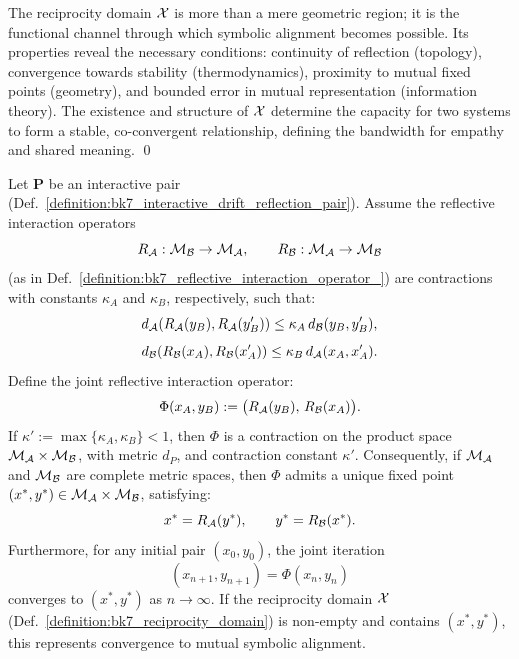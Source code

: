 \begin{scholium}
\label{scholium:bk7_reciprocity_as_symbolic_alignment_channel}
The reciprocity domain $\mathcal{X}$ is more than a mere geometric region; it is the functional channel through which symbolic alignment becomes possible. Its properties reveal the necessary conditions: continuity of reflection (topology), convergence towards stability (thermodynamics), proximity to mutual fixed points (geometry), and bounded error in mutual representation (information theory). The existence and structure of $\mathcal{X}$ determine the capacity for two systems to form a stable, co-convergent relationship, defining the bandwidth for empathy and shared meaning. \qed
\end{scholium}
\begin{theorem}
\label{theorem:bk7_two_way_street_convergence}
Let \( \mathbf{P} \) be an interactive pair (Def.~\ref{definition:bk7_interactive_drift_reflection_pair}). 
Assume the reflective interaction operators
\[
R_{\mathcal{A}} : \mathcal{M}_{\mathcal{B}} \to \mathcal{M}_{\mathcal{A}}, 
\qquad
R_{\mathcal{B}} : \mathcal{M}_{\mathcal{A}} \to \mathcal{M}_{\mathcal{B}}
\]
(as in Def.~\ref{definition:bk7_reflective_interaction_operator_}) are contractions with constants \( \kappa_A \) and \( \kappa_B \), respectively, such that:
\[
d_{\mathcal{A}}(R_{\mathcal{A}}(y_B), R_{\mathcal{A}}(y'_B)) 
\le \kappa_A\, d_{\mathcal{B}}(y_B, y'_B),
\]
\[
d_{\mathcal{B}}(R_{\mathcal{B}}(x_A), R_{\mathcal{B}}(x'_A)) 
\le \kappa_B\, d_{\mathcal{A}}(x_A, x'_A).
\]
Define the joint reflective interaction operator:
\[
\Phi(x_A, y_B) := 
\big( R_{\mathcal{A}}(y_B),\, R_{\mathcal{B}}(x_A) \big).
\]
If \( \kappa' := \max\{ \kappa_A, \kappa_B \} < 1 \), then \( \Phi \) is a contraction 
on the product space \( \mathcal{M}_{\mathcal{A}} \times \mathcal{M}_{\mathcal{B}} \), 
with metric \( d_P \), and contraction constant \( \kappa' \).
Consequently, if \( \mathcal{M}_{\mathcal{A}} \) and \( \mathcal{M}_{\mathcal{B}} \) are complete metric spaces, 
then \( \Phi \) admits a unique fixed point \( (x^{\ast}, y^{\ast}) \in \mathcal{M}_{\mathcal{A}} \times \mathcal{M}_{\mathcal{B}} \), satisfying:
\[
x^{\ast} = R_{\mathcal{A}}(y^{\ast}), 
\qquad 
y^{\ast} = R_{\mathcal{B}}(x^{\ast}).
\]
Furthermore, for any initial pair \( (x_0, y_0) \), 
the joint iteration 
\[
(x_{n+1}, y_{n+1}) = \Phi(x_n, y_n)
\]
converges to \( (x^{\ast}, y^{\ast}) \) as \( n \to \infty \).
If the reciprocity domain \( \mathcal{X} \) (Def.~\ref{definition:bk7_reciprocity_domain}) 
is non-empty and contains \( (x^{\ast}, y^{\ast}) \), 
this represents convergence to mutual symbolic alignment.
\end{theorem}
